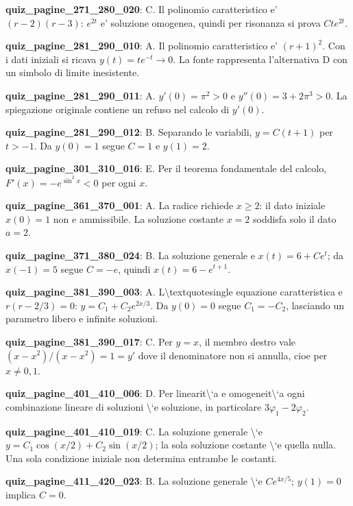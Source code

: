 \documentclass[11pt,a4paper]{article}
\newcounter{quiz}
\begin{document}
\noindent\textbf{quiz\_pagine\_271\_280\_020}: C. Il polinomio caratteristico e' $(r-2)(r-3)$: $e^{2t}$ e' soluzione omogenea, quindi per risonanza si prova $Cte^{2t}$.\par\medskip
\noindent\textbf{quiz\_pagine\_281\_290\_010}: A. Il polinomio caratteristico e' $(r+1)^2$. Con i dati iniziali si ricava $y(t)=te^{-t}\to0$. La fonte rappresenta l'alternativa D con un simbolo di limite inesistente.\par\medskip
\noindent\textbf{quiz\_pagine\_281\_290\_011}: A. $y'(0)=\pi^2>0$ e $y''(0)=3+2\pi^3>0$. La spiegazione originale contiene un refuso nel calcolo di $y'(0)$.\par\medskip
\noindent\textbf{quiz\_pagine\_281\_290\_012}: B. Separando le variabili, $y=C(t+1)$ per $t>-1$. Da $y(0)=1$ segue $C=1$ e $y(1)=2$.\par\medskip
\noindent\textbf{quiz\_pagine\_301\_310\_016}: E. Per il teorema fondamentale del calcolo, $F\prime(x)=-e^{\sin^2x}<0$ per ogni $x$.\par\medskip
\noindent\textbf{quiz\_pagine\_361\_370\_001}: A. La radice richiede $x\geq2$: il dato iniziale $x(0)=1$ non e ammissibile. La soluzione costante $x=2$ soddisfa solo il dato $a=2$.\par\medskip
\noindent\textbf{quiz\_pagine\_371\_380\_024}: B. La soluzione generale e $x(t)=6+Ce^t$; da $x(-1)=5$ segue $C=-e$, quindi $x(t)=6-e^{t+1}$.\par\medskip
\noindent\textbf{quiz\_pagine\_381\_390\_003}: A. L\textbackslash{}textquotesingle equazione caratteristica e $r(r-2/3)=0$: $y=C_1+C_2e^{2x/3}$. Da $y(0)=0$ segue $C_1=-C_2$, lasciando un parametro libero e infinite soluzioni.\par\medskip
\noindent\textbf{quiz\_pagine\_381\_390\_017}: C. Per $y=x$, il membro destro vale $(x-x^2)/(x-x^2)=1=y\prime$ dove il denominatore non si annulla, cioe per $x\neq0,1$.\par\medskip
\noindent\textbf{quiz\_pagine\_401\_410\_006}: D. Per linearit\textbackslash{}`a e omogeneit\textbackslash{}`a ogni combinazione lineare di soluzioni \textbackslash{}`e soluzione, in particolare $3\varphi_1-2\varphi_2$.\par\medskip
\noindent\textbf{quiz\_pagine\_401\_410\_019}: C. La soluzione generale \textbackslash{}`e $y=C_1\cos(x/2)+C_2\sin(x/2)$; la sola soluzione costante \textbackslash{}`e quella nulla. Una sola condizione iniziale non determina entrambe le costanti.\par\medskip
\noindent\textbf{quiz\_pagine\_411\_420\_023}: B. La soluzione generale \textbackslash{}`e $Ce^{4x/5}$; $y(1)=0$ implica $C=0$.\par\medskip
\end{document}

